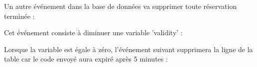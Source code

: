 \documentclass{article}
\begin{document}
\begin{enumerate}
\begin{enumerate}
\begin{enumerate}
         
         Un autre événement dans la base de données va supprimer toute réservation terminée :
         
		\hspace*{-1.05in}
               \noindent{}         
         
         
         \vspace{4cm}
         
          Cet événement consiste à diminuer une variable 'validity' :
          \vspace{0.5cm}
         
		\hspace*{-1.05in}
               \noindent{}
               \vspace{1cm}
                Lorsque la variable est égale à zéro, l'événement suivant supprimera la ligne de la table car le code envoyé aura expiré après 5 minutes :
                

\end{enumerate}
\end{enumerate}
\end{enumerate}
\end{document}
